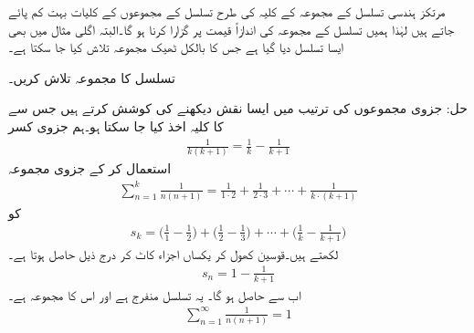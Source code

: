 مرتکز ہندسی تسلسل کے مجموعہ کے کلیہ کی طرح تسلسل کے مجموعوں کے کلیات بہت کم پائے جاتے ہیں لہٰذا ہمیں تسلسل کے مجموعہ کی اندازاً قیمت پر گزارا کرنا ہو گا۔البتہ اگلی مثال میں بھی ایسا تسلسل دیا گیا ہے جس کا بالکل ٹھیک  مجموعہ تلاش کیا جا سکتا ہے۔

تسلسل  کا مجموعہ تلاش کریں۔

حل:\quad
 جزوی مجموعوں کی ترتیب میں ایسا نقش دیکھنے کی کوشش کرتے ہیں جس سے  کا کلیہ اخذ کیا جا سکتا ہو۔ہم جزوی کسر 
\begin{align}
\frac{1}{k(k+1)}=\frac{1}{k}-\frac{1}{k+1}
\end{align}
استعمال کر کے جزوی مجموعہ
\begin{align*}
\sum_{n=1}^{k}\frac{1}{n(n+1)}=\frac{1}{1\cdot 2}+\frac{1}{2\cdot 3}+\cdots+\frac{1}{k\cdot(k+1)}
\end{align*}
کو
\begin{align}
s_k=\big(\frac{1}{1}-\frac{1}{2}\big)+\big(\frac{1}{2}-\frac{1}{3}\big)+\cdots+\big(\frac{1}{k}-\frac{1}{k+1}\big)
\end{align}
 لکھتے ہیں۔قوسین کھول کر یکساں اجزاء کاٹ کر درج ذیل حاصل ہوتا ہے۔
\begin{align}
s_n=1-\frac{1}{k+1}
\end{align}
اب  سے  حاصل ہو گا۔ یہ تسلسل منفرج ہے اور اس کا مجموعہ  ہے۔
\begin{align*}
\sum_{n=1}^{\infty}\frac{1}{n(n+1)}=1
\end{align*}


